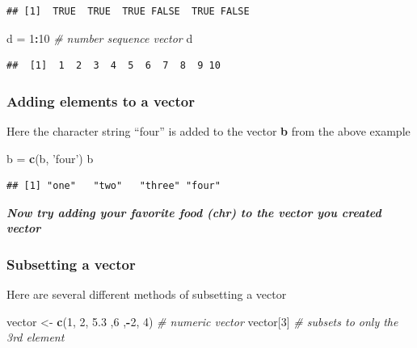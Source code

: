 \documentclass[
]{article}
\newenvironment{Shaded}{\begin{snugshade}}{\end{snugshade}}
\newcommand{\CommentTok}[1]{\textcolor[rgb]{0.56,0.35,0.01}{\textit{#1}}}
\newcommand{\DecValTok}[1]{\textcolor[rgb]{0.00,0.00,0.81}{#1}}
\newcommand{\FloatTok}[1]{\textcolor[rgb]{0.00,0.00,0.81}{#1}}
\newcommand{\KeywordTok}[1]{\textcolor[rgb]{0.13,0.29,0.53}{\textbf{#1}}}
\newcommand{\NormalTok}[1]{#1}
\newcommand{\OperatorTok}[1]{\textcolor[rgb]{0.81,0.36,0.00}{\textbf{#1}}}
\newcommand{\StringTok}[1]{\textcolor[rgb]{0.31,0.60,0.02}{#1}}
\begin{document}
\begin{verbatim}
## [1]  TRUE  TRUE  TRUE FALSE  TRUE FALSE
\end{verbatim}

\begin{Shaded}
\begin{Highlighting}[]
\NormalTok{d =}\StringTok{ }\DecValTok{1}\OperatorTok{:}\DecValTok{10} \CommentTok{# number sequence vector}
\NormalTok{d}
\end{Highlighting}
\end{Shaded}

\begin{verbatim}
##  [1]  1  2  3  4  5  6  7  8  9 10
\end{verbatim}

\hypertarget{adding-elements-to-a-vector}{%
\subsubsection{\texorpdfstring{\textbf{Adding elements to a
vector}}{Adding elements to a vector}}\label{adding-elements-to-a-vector}}

Here the character string ``four'' is added to the vector \textbf{b}
from the above example

\begin{Shaded}
\begin{Highlighting}[]
\NormalTok{b =}\StringTok{ }\KeywordTok{c}\NormalTok{(b, }\StringTok{'four'}\NormalTok{)}
\NormalTok{b}
\end{Highlighting}
\end{Shaded}

\begin{verbatim}
## [1] "one"   "two"   "three" "four"
\end{verbatim}

\textbf{\emph{Now try adding your favorite food (chr) to the vector you
created vector}}

\hypertarget{subsetting-a-vector}{%
\subsubsection{\texorpdfstring{\textbf{Subsetting a
vector}}{Subsetting a vector}}\label{subsetting-a-vector}}

Here are several different methods of subsetting a vector

\begin{Shaded}
\begin{Highlighting}[]
\NormalTok{vector <-}\StringTok{ }\KeywordTok{c}\NormalTok{(}\DecValTok{1}\NormalTok{, }\DecValTok{2}\NormalTok{, }\FloatTok{5.3}\NormalTok{ ,}\DecValTok{6}\NormalTok{ ,}\OperatorTok{-}\DecValTok{2}\NormalTok{, }\DecValTok{4}\NormalTok{) }\CommentTok{# numeric vector}
\NormalTok{vector[}\DecValTok{3}\NormalTok{] }\CommentTok{# subsets to only the 3rd element}
\end{Highlighting}
\end{Shaded}
\end{document}
